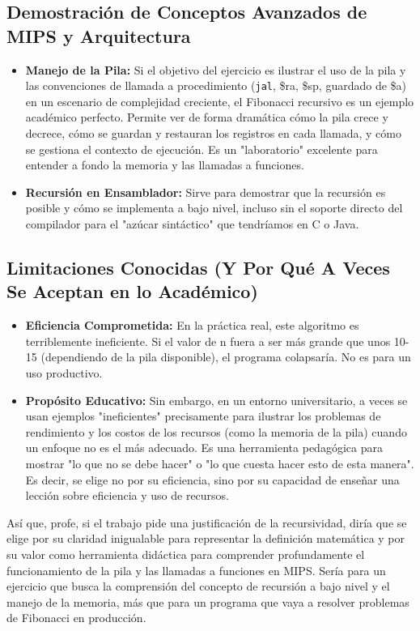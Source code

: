 \documentclass{article}
\begin{document}
\subsection*{Demostración de Conceptos Avanzados de MIPS y Arquitectura}
\begin{itemize}
    \item \textbf{Manejo de la Pila:} Si el objetivo del ejercicio es ilustrar el uso de la pila y las convenciones de llamada a procedimiento (\texttt{jal}, \$ra, \$sp, guardado de \$a) en un escenario de complejidad creciente, el Fibonacci recursivo es un ejemplo académico perfecto. Permite ver de forma dramática cómo la pila crece y decrece, cómo se guardan y restauran los registros en cada llamada, y cómo se gestiona el contexto de ejecución. Es un "laboratorio" excelente para entender a fondo la memoria y las llamadas a funciones.
    \item \textbf{Recursión en Ensamblador:} Sirve para demostrar que la recursión es posible y cómo se implementa a bajo nivel, incluso sin el soporte directo del compilador para el "azúcar sintáctico" que tendríamos en C o Java.
\end{itemize}

\subsection*{Limitaciones Conocidas (Y Por Qué A Veces Se Aceptan en lo Académico)}
\begin{itemize}
    \item \textbf{Eficiencia Comprometida:} En la práctica real, este algoritmo es terriblemente ineficiente. Si el valor de n fuera a ser más grande que unos 10-15 (dependiendo de la pila disponible), el programa colapsaría. No es para un uso productivo.
    \item \textbf{Propósito Educativo:} Sin embargo, en un entorno universitario, a veces se usan ejemplos "ineficientes" precisamente para ilustrar los problemas de rendimiento y los costos de los recursos (como la memoria de la pila) cuando un enfoque no es el más adecuado. Es una herramienta pedagógica para mostrar "lo que no se debe hacer" o "lo que cuesta hacer esto de esta manera". Es decir, se elige no por su eficiencia, sino por su capacidad de enseñar una lección sobre eficiencia y uso de recursos.
\end{itemize}
Así que, profe, si el trabajo pide una justificación de la recursividad, diría que se elige por su claridad inigualable para representar la definición matemática y por su valor como herramienta didáctica para comprender profundamente el funcionamiento de la pila y las llamadas a funciones en MIPS. Sería para un ejercicio que busca la comprensión del concepto de recursión a bajo nivel y el manejo de la memoria, más que para un programa que vaya a resolver problemas de Fibonacci en producción.
\end{document}
